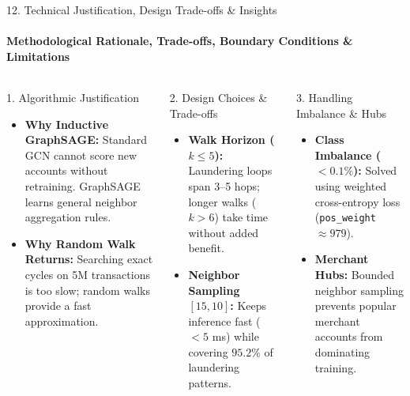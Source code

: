 \documentclass[aspectratio=169, 11pt]{beamer}
\begin{document}
\begin{frame}{12. Technical Justification, Design Trade-offs \& Insights}
    \framesubtitle{Methodological Rationale, Trade-offs, Boundary Conditions \& Limitations}
    \vspace{-0.15cm}
    \begin{columns}[T]
        \begin{block}{1. Algorithmic Justification}
            \scriptsize
            \begin{itemize}\setlength{\itemsep}{1pt}\setlength{\parskip}{0pt}
                \item \textbf{Why Inductive GraphSAGE:} Standard GCN cannot score new accounts without retraining. GraphSAGE learns general neighbor aggregation rules.
                \item \textbf{Why Random Walk Returns:} Searching exact cycles on 5M transactions is too slow; random walks provide a fast approximation.
            \end{itemize}
        \end{block}

        \begin{block}{2. Design Choices \& Trade-offs}
            \scriptsize
            \begin{itemize}\setlength{\itemsep}{1pt}\setlength{\parskip}{0pt}
                \item \textbf{Walk Horizon ($k \le 5$):} Laundering loops span 3--5 hops; longer walks ($k > 6$) take time without added benefit.
                \item \textbf{Neighbor Sampling $[15, 10]$:} Keeps inference fast ($<5$ ms) while covering $95.2\%$ of laundering patterns.
            \end{itemize}
        \end{block}

        \begin{block}{3. Handling Imbalance \& Hubs}
            \scriptsize
            \begin{itemize}\setlength{\itemsep}{1pt}\setlength{\parskip}{0pt}
                \item \textbf{Class Imbalance ($<0.1\%$):} Solved using weighted cross-entropy loss (\texttt{pos\_weight} $\approx 979$).
                \item \textbf{Merchant Hubs:} Bounded neighbor sampling prevents popular merchant accounts from dominating training.
            \end{itemize}
        \end{block}


\end{columns}
\end{frame}
\end{document}
